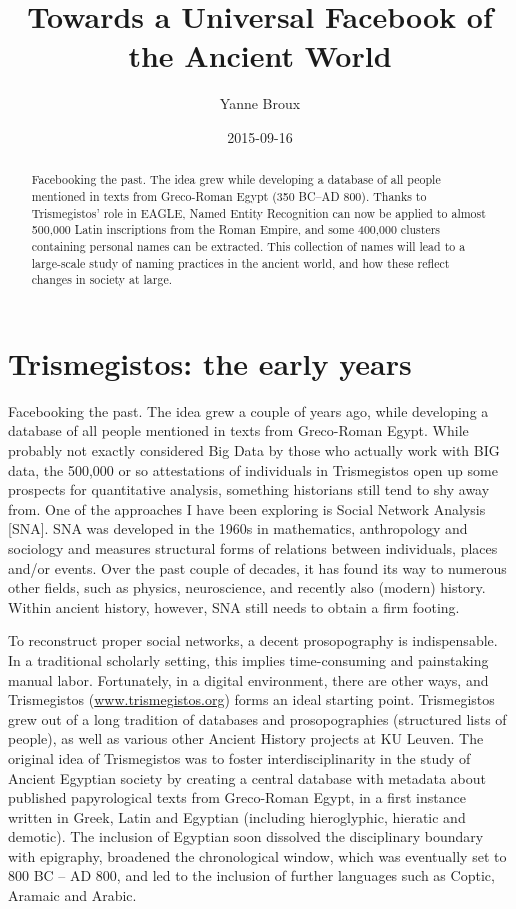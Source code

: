 \documentclass[amsthm,ebook]{saparticle}
\title{Towards a Universal Facebook of the Ancient World}
\author[KU]{Yanne Broux\corref{first}}
\date{2015-09-16}
\begin{document}
\maketitle
\begin{abstract}
Facebooking the past. The idea grew while developing a database of all people mentioned in texts from Greco-Roman Egypt
(350 BC–AD 800). Thanks to Trismegistos' role in EAGLE, Named Entity Recognition can now be applied to almost 500,000
Latin inscriptions from the Roman Empire, and some 400,000 clusters containing personal names can be extracted. This
collection of names will lead to a large-scale study of naming practices in the ancient world, and how these reflect
changes in society at large.
\end{abstract}




\section{Trismegistos: the early years}


\noindent Facebooking the past. The idea grew a couple of years ago, while developing a database of all people mentioned in texts
from Greco-Roman Egypt. While probably not exactly considered Big Data by those who actually work with BIG data, the
500,000 or so attestations of individuals in Trismegistos open up some prospects for quantitative analysis, something
historians still tend to shy away from. One of the approaches I have been exploring is Social Network Analysis [SNA].
SNA was developed in the 1960s in mathematics, anthropology and sociology and measures structural forms of relations
between individuals, places and/or events. Over the past couple of decades, it has found its way to numerous other
fields, such as physics, neuroscience, and recently also (modern) history. Within ancient history, however, SNA still
needs to obtain a firm footing.

To reconstruct proper social networks, a decent prosopography is indispensable. In a traditional scholarly setting, this
implies time-consuming and painstaking manual labor. Fortunately, in a digital environment, there are other ways, and
Trismegistos (\url{www.trismegistos.org}) forms an ideal starting point. Trismegistos grew out of a long tradition of
databases and prosopographies (structured lists of people), as well as various other Ancient History projects at KU
Leuven. The original idea of Trismegistos was to foster interdisciplinarity in the study of Ancient Egyptian society by
creating a central database with metadata about published papyrological texts from Greco-Roman Egypt, in a first
instance written in Greek, Latin and Egyptian (including hieroglyphic, hieratic and demotic). The inclusion of Egyptian
soon dissolved the disciplinary boundary with epigraphy, broadened the chronological window, which was eventually set
to 800 BC – AD 800, and led to the inclusion of further languages such as Coptic, Aramaic and Arabic.
\end{document}
